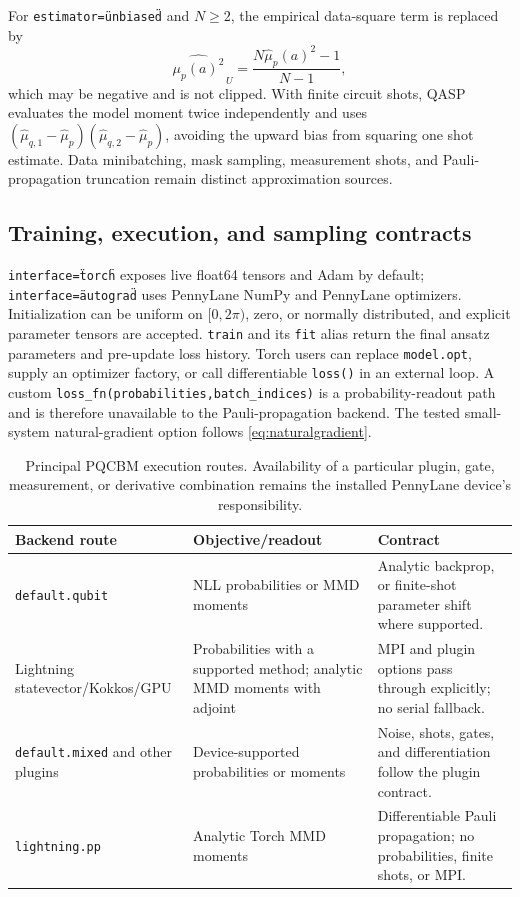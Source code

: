 \documentclass[10pt]{article}
\newcommand{\code}[1]{\texttt{#1}}
\begin{document}
For \code{estimator=\"unbiased\"} and $N\geq2$, the empirical data-square term
is replaced by
\begin{equation}
  \widehat{\mu_p(a)^2}_{\,U}
  =\frac{N\widehat{\mu}_p(a)^2-1}{N-1},
  \label{eq:pqcbm-data-u}
\end{equation}
which may be negative and is not clipped.  With finite circuit shots, QASP
evaluates the model moment twice independently and uses
$(\widehat\mu_{q,1}-\widehat\mu_p)
(\widehat\mu_{q,2}-\widehat\mu_p)$, avoiding the upward bias from squaring one
shot estimate.  Data minibatching, mask sampling, measurement shots, and
Pauli-propagation truncation remain distinct approximation sources.

\subsection{Training, execution, and sampling contracts}

\code{interface=\"torch\"} exposes live float64 tensors and Adam by default;
\code{interface=\"autograd\"} uses PennyLane NumPy and PennyLane optimizers.
Initialization can be uniform on $[0,2\pi)$, zero, or normally distributed,
and explicit parameter tensors are accepted.  \code{train} and its
\code{fit} alias return the final ansatz parameters and pre-update loss
history.  Torch users can replace \code{model.opt}, supply an optimizer factory,
or call differentiable \code{loss()} in an external loop.  A custom
\code{loss\_fn(probabilities,batch\_indices)} is a probability-readout path and
is therefore unavailable to the Pauli-propagation backend.  The tested
small-system natural-gradient option follows \cref{eq:naturalgradient}.

\begin{table}[H]
\centering
\caption{Principal PQCBM execution routes.  Availability of a particular
plugin, gate, measurement, or derivative combination remains the installed
PennyLane device's responsibility.}
\label{tab:pqcbm-backends}
\small
\begin{tabularx}{\textwidth}{@{}p{}p{}X@{}}
\toprule
Backend route & Objective/readout & Contract \\
\midrule
\code{default.qubit} & NLL probabilities or MMD moments & Analytic backprop, or finite-shot parameter shift where supported. \\
Lightning statevector/Kokkos/GPU & Probabilities with a supported method; analytic MMD moments with adjoint & MPI and plugin options pass through explicitly; no serial fallback. \\
\code{default.mixed} and other plugins & Device-supported probabilities or moments & Noise, shots, gates, and differentiation follow the plugin contract. \\
\code{lightning.pp} & Analytic Torch MMD moments & Differentiable Pauli propagation; no probabilities, finite shots, or MPI. \\
\bottomrule
\end{tabularx}
\end{table}
\end{document}
